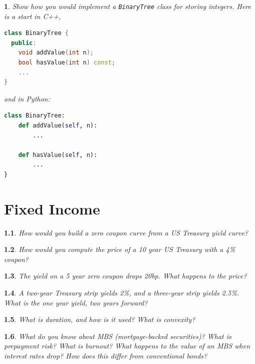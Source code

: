\documentclass{report}
\newtheorem{problem}{}
\numberwithin{problem}{chapter} %
\begin{document}
\begin{problem}
Show how you would implement a \verb|BinaryTree| class for storing integers. Here is a start in C++,
\begin{lstlisting}[language=C++]
class BinaryTree {
  public:
    void addValue(int n);
    bool hasValue(int n) const;
    ...
}
\end{lstlisting}
and in Python:
\begin{lstlisting}[language=python]
class BinaryTree:
	def addValue(self, n):
   		...
		
	def hasValue(self, n):
   		...
}
\end{lstlisting}

\end{problem}



\chapter{Fixed Income}

\begin{problem}
How would you build a zero coupon curve from a US Treasury yield curve?
\end{problem}

\begin{problem}
How would you compute the price of a 10 year US Treasury with a 4\% coupon?
\end{problem}

\begin{problem}
The yield on a 5 year zero coupon drops 20bp. What happens to the price?
\end{problem}

\begin{problem}
A two-year Treasury strip yields 2\%, and a three-year strip yields 2.5\%. What is the one year yield, two years forward? 
\end{problem}

\begin{problem}
What is duration, and how is it used? What is convexity? 
\end{problem}

\begin{problem}
What do you know about MBS (mortgage-backed securities)? What is prepayment risk? What is burnout? What happens to the value of an MBS when interest rates drop? How does this differ from conventional bonds?
\end{problem}
\end{document}
